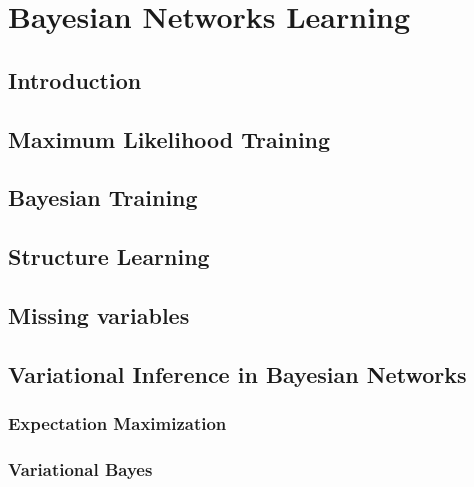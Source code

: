 \documentclass[twoside,openright,titlepage,numbers=noenddot,openany,headinclude,footinclude=true, cleardoublepage=empty,abstractoff,BCOR=5mm,paper=a4,fontsize=11pt, dvipsnames]{scrreprt}
\begin{document}
\part{Bayesian Networks Learning}

\chapter{Introduction}



\chapter{Maximum Likelihood Training}



\chapter{Bayesian Training}



\chapter{Structure Learning}



\chapter{Missing variables}



\chapter{Variational Inference in Bayesian Networks}



\section{Expectation Maximization}\label{sec:em}



\section{Variational Bayes}
\end{document}
